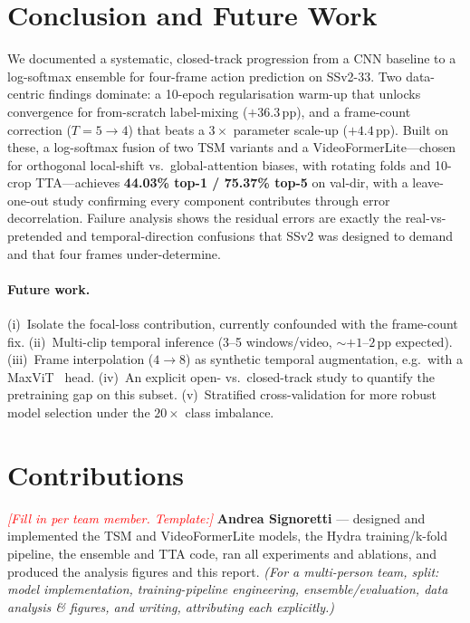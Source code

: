 \documentclass[10pt,twocolumn,letterpaper]{article}
\begin{document}
\section{Conclusion and Future Work}
\label{sec:conclusion}
We documented a systematic, closed-track progression from a CNN baseline to a
log-softmax ensemble for four-frame action prediction on SSv2-33. Two
data-centric findings dominate: a 10-epoch regularisation warm-up that unlocks
convergence for from-scratch label-mixing ($+36.3$\,pp), and a frame-count
correction ($T{=}5\!\rightarrow\!4$) that beats a $3\times$ parameter scale-up
($+4.4$\,pp). Built on these, a log-softmax fusion of two TSM variants and a
VideoFormerLite---chosen for orthogonal local-shift vs.\ global-attention
biases, with rotating folds and 10-crop TTA---achieves \textbf{44.03\% top-1 /
75.37\% top-5} on val-dir, with a leave-one-out study confirming every component
contributes through error decorrelation. Failure analysis shows the residual
errors are exactly the real-vs-pretended and temporal-direction confusions that
SSv2 was designed to demand and that four frames under-determine.

\paragraph{Future work.}
(i)~Isolate the focal-loss contribution, currently confounded with the
frame-count fix. (ii)~Multi-clip temporal inference (3--5 windows/video,
${\sim}+1$--$2$\,pp expected). (iii)~Frame interpolation ($4\!\rightarrow\!8$) as
synthetic temporal augmentation, e.g.\ with a MaxViT~\cite{tu2022maxvit} head.
(iv)~An explicit open- vs.\ closed-track study to quantify the pretraining gap on
this subset. (v)~Stratified cross-validation for more robust model selection
under the $20\times$ class imbalance.

\section*{Contributions}
\noindent\textcolor{red}{\emph{[Fill in per team member. Template:]}}
\textbf{Andrea Signoretti} --- designed and implemented the TSM and
VideoFormerLite models, the Hydra training/k-fold pipeline, the ensemble and TTA
code, ran all experiments and ablations, and produced the analysis figures and
this report. \emph{(For a multi-person team, split: model implementation,
training-pipeline engineering, ensemble/evaluation, data analysis \& figures,
and writing, attributing each explicitly.)}

{\small


}
\end{document}
